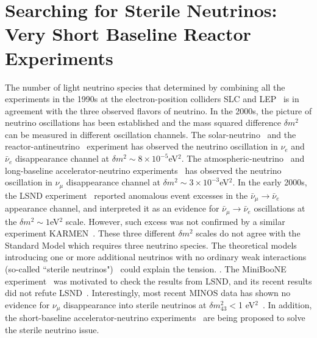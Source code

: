 \section{Searching for Sterile Neutrinos: Very Short Baseline Reactor Experiments}

The number of light neutrino species that determined by combining all the experiments in the 1990s at the electron-position colliders SLC and LEP~\cite{EW-2005} is in agreement with the three observed flavors of neutrino. In the 2000s, the picture of neutrino oscillations has been established and the mass squared difference $\delta m^2$ can be measured in different oscillation channels. The solar-neutrino~\cite{SNO} and the reactor-antineutrino~\cite{Kamland03} experiment has observed the neutrino oscillation in $\nu_e$ and $\bar\nu_e$ disappearance channel at $\delta m^2\sim8\times10^{-5}$eV$^2$. The atmospheric-neutrino~\cite{SuperK98} and long-baseline accelerator-neutrino experiments~\cite{K2K-2003,MINOS06} has observed the neutrino oscillation in $\nu_\mu$ disappearance channel at $\delta m^2\sim3\times10^{-3}$eV$^2$. In the early 2000s, the LSND experiment~\cite{LSND2001} reported anomalous event excesses in the $\bar\nu_\mu\rightarrow\bar\nu_e$ appearance channel, and interpreted it as an evidence for $\bar\nu_\mu\rightarrow\bar\nu_e$ oscillations at the $\delta m^2\sim1$eV$^2$ scale. However, such excess was not confirmed by a similar experiment KARMEN~\cite{KARMEN2002}. These three different $\delta m^2$ scales do not agree with the Standard Model which requires three neutrino species. The theoretical models introducing one or more additional neutrinos with no ordinary weak interactions (so-called ``sterile neutrinos")~\cite{Serel04} could explain the tension. 
. The MiniBooNE experiment~\cite{MiniBooNE2007} was motivated to check the results from LSND, and its recent results did not refute LSND~\cite{MiniBooNE2013}. Interestingly, most recent MINOS data has shown no evidence for $\nu_\mu$ disappearance into sterile neutrinos at $\delta m^2_{43}<$1 eV$^2$~\cite{Sousa-Neutrino14}.
In addition, the short-baseline accelerator-neutrino experiments~\cite{nuSTORM,IsoDAR} are being proposed to solve the sterile neutrino issue.

